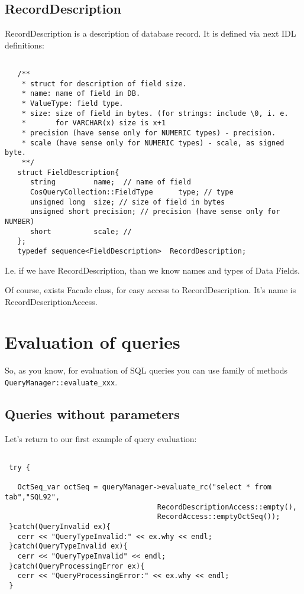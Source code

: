 \documentclass[10pt]{article}
\begin{document}
\subsection{ RecordDescription }

 RecordDescription is a description of database record. It is defined via next
IDL definitions:

\begin{verbatim}

   /**
    * struct for description of field size.
    * name: name of field in DB.
    * ValueType: field type.
    * size: size of field in bytes. (for strings: include \0, i. e. 
    *       for VARCHAR(x) size is x+1
    * precision (have sense only for NUMERIC types) - precision.
    * scale (have sense only for NUMERIC types) - scale, as signed byte.
    **/
   struct FieldDescription{
      string         name;  // name of field
      CosQueryCollection::FieldType      type; // type
      unsigned long  size; // size of field in bytes
      unsigned short precision; // precision (have sense only for NUMBER)
      short          scale; // 
   };
   typedef sequence<FieldDescription>  RecordDescription;

\end{verbatim}

 I.e. if we have RecordDescription, than we know names and types
 of Data Fields.

 Of course, exists Facade class, for easy access to RecordDescription.
 It's name is RecordDescriptionAccess.

\section{ Evaluation of queries }

 So, as you know, for evaluation of SQL queries you can use family of
methods \verb|QueryManager::evaluate_xxx|.

\subsection{ Queries without parameters  }

 Let's return to our first example of query evaluation:

\begin{verbatim}

 try {

   OctSeq_var octSeq = queryManager->evaluate_rc("select * from tab","SQL92",
                                    RecordDescriptionAccess::empty(),
                                    RecordAccess::emptyOctSeq()); 
 }catch(QueryInvalid ex){
   cerr << "QueryTypeInvalid:" << ex.why << endl;
 }catch(QueryTypeInvalid ex){
   cerr << "QueryTypeInvalid" << endl;
 }catch(QueryProcessingError ex){
   cerr << "QueryProcessingError:" << ex.why << endl;
 }

\end{verbatim}
\end{document}
